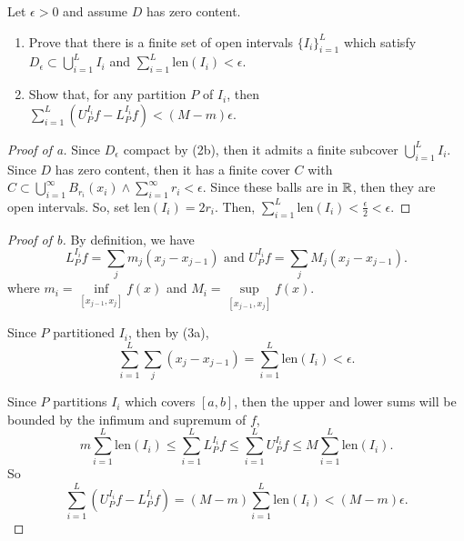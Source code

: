 \documentclass[../hw6]{subfiles}
\begin{document}
\begin{problem}[3]
Let $\epsilon>0$ and assume $D$ has zero content.
\begin{enumerate}[label=(\alph*)]
	\item Prove that there is a finite set of open intervals $\{I_i\}_{i=1}^{L}$ which satisfy $D_{\epsilon}\subset \bigcup\limits_{i=1}^{L}I_i$ and $\sum\limits_{i=1}^{L}\text{len}{(I_i)}<\epsilon$.
	\item Show that, for any partition $P$ of  $I_i$, then  $\sum\limits_{i=1}^{L}(U_{P}^{I_i}f - L_{P}^{I_i}f)<(M-m)\epsilon$.
\end{enumerate}
\end{problem}
\begin{proof}[Proof of a]
	Since $D_\epsilon$ compact by (2b), then it admits a finite subcover $\bigcup\limits_{i=1}^{L}I_i$.
	Since $D$ has zero content, then it has a finite cover $C$ with  $C\subset \bigcup\limits_{i=1}^{\infty} B_{r_i}(x_i) \land \sum\limits_{i=1}^{\infty}r_i<\epsilon$.
	Since these balls are in $\mathbb{R}$, then they are open intervals.
	So, set $\text{len}{(I_i)}=2r_i$.
	Then, $\sum\limits_{i=1}^{L} \text{len}{(I_i)}<\frac{\epsilon}{2}<\epsilon$.
\end{proof}
\begin{proof}[Proof of b]
	By definition, we have \[
		L_P^{I_i}f = \sum_{j} m_j (x_j-x_{j-1}) \text{ and } U_P^{I_i}f = \sum_{j} M_j (x_j-x_{j-1})
		.\] where $m_i = \inf\limits_{[x_{j-1},x_j]}f(x)$ and $M_i = \sup\limits_{[x_{j-1},x_j]}f(x)$.

	Since $P$ partitioned  $I_i$, then by (3a),  \[
		\sum_{i=1}^{L} \sum_{j} (x_j-x_{j-1})= \sum_{i=1 }^{L} \text{len}{(I_i)}<\epsilon
		.\]

	Since $P$ partitions  $I_i$ which covers  $[a,b]$, then the upper and lower sums will be bounded by the infimum and supremum of $f$,  \[
		m \sum_{i=1 }^{L} \text{len}{(I_i)}\le \sum_{i=1 }^{L} L_P^{I_i} f \le \sum_{i=1 }^{L} U_P^{I_i} f \le M\sum_{i=1 }^{L} \text{len}{(I_i)}
		.\]
	So \[
		\sum_{i=1 }^{L} (U_P^{I_i}f-L_P^{I_i}f)=(M-m)\sum_{i=1 }^{L} \text{len}{(I_i)}<(M-m)\epsilon
		.\]
\end{proof}
\end{document}
